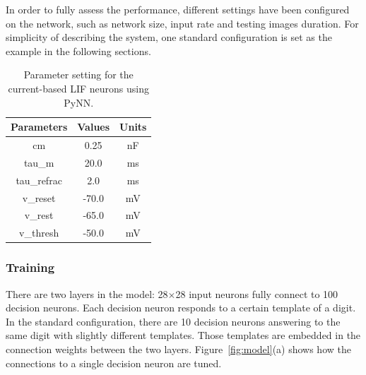 \documentclass{frontiersENG} %
\begin{document}
In order to fully assess the performance, different settings have been configured on the network, such as network size, input rate and testing images duration.
For simplicity of describing the system, one standard configuration is set as the example in the following sections.
\begin{table}[hbbp]
	\centering
	\caption{\label{tbl:pynnSetting}Parameter setting for the current-based LIF neurons using PyNN.}
	\bgroup
	\def\arraystretch{1.4}
	\begin{tabular}{c c c}
		Parameters & Values & Units \\
		\hline
		cm & 0.25 & nF	\\
		tau\_m & 20.0 & ms\\
		tau\_refrac & 2.0 & ms\\
		v\_reset & -70.0 & mV\\
		v\_rest & -65.0 & mV\\
		v\_thresh & -50.0 & mV\\
	\end{tabular}
	\egroup
\end{table}

\subsubsection{Training}
There are two layers in the model: 28$\times$28 input neurons fully connect to 100 decision neurons.
Each decision neuron responds to a certain template of a digit.
In the standard configuration, there are 10 decision neurons answering to the same digit with slightly different templates.
Those templates are embedded in the connection weights between the two layers.
Figure~\ref{fig:model}(a) shows how the connections to a single decision neuron are tuned.
\end{document}
